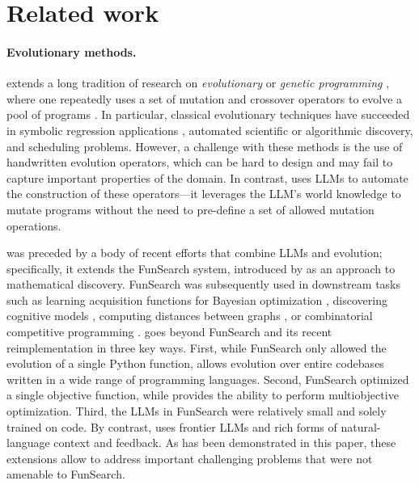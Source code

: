 \section{Related work}
\label{sec:related_work}

\paragraph{Evolutionary methods.}
\method extends a long tradition of research on \emph{evolutionary} or \emph{genetic programming} \citep{langdon2013foundations}, where one repeatedly uses a set of mutation and crossover operators to evolve a pool of programs \citep{koza1994genetic,banzhaf1998genetic}.
In particular, classical evolutionary techniques have succeeded in symbolic regression applications \citep{schmidt2009distilling,ma2022evolving}, automated scientific \citep{cranmer2023interpretable} or algorithmic \citep{chen2023symbolic} discovery, and scheduling \citep{zhang2021genetic} problems.
However, a challenge with these methods is the use of handwritten evolution operators, which can be hard to design and may fail to capture important properties of the domain.
In contrast, \method uses LLMs to automate the construction of these operators---it leverages the LLM's world knowledge to mutate programs without the need to pre-define a set of allowed mutation operations. 

\method was preceded by a body of recent efforts that combine LLMs and evolution; specifically, it extends the FunSearch system, introduced by \citet{paredes2023mathematical} as an approach to mathematical discovery.
FunSearch was subsequently used in downstream tasks such as learning acquisition functions for Bayesian optimization \citep{aglietti2025funbo}, discovering cognitive models \citep{castro2025discovering}, computing distances between graphs \citep{verma2025grail}, or combinatorial competitive programming \citep{velickovic2024amplifying}. 
\method goes beyond FunSearch and its recent reimplementation \citep{ellenberg2025generative} in three key ways.
First, while FunSearch only allowed the evolution of a single Python function, \method allows evolution over entire codebases written in a wide range of programming languages.
Second, FunSearch optimized a single objective function, while \method provides the ability to perform multiobjective optimization.
Third, the LLMs in FunSearch were relatively small and solely trained on code.
By contrast, \method uses frontier LLMs and rich forms of natural-language context and feedback.
As has been demonstrated in this paper, these extensions allow \method to address important challenging problems that were not amenable to FunSearch.

